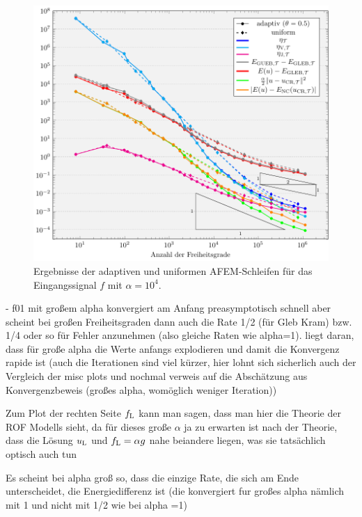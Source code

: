 \begin{figure}[p]
  \centering
  \includegraphics[width=\linewidth]
    {pictures/chapExperiments/secExactSol/f01LargeAlpha/conv.pdf}
  \caption{Ergebnisse der adaptiven und uniformen AFEM-Schleifen für das 
  Eingangssignal $f$ mit $\alpha=10^4$.}
  \label{fig:f01LargeAlphaConvergence}
\end{figure}

  - f01 mit großem alpha konvergiert am Anfang preasymptotisch schnell aber
    scheint bei großen Freiheitsgraden dann auch die Rate 1/2 (für Gleb Kram)
    bzw. 1/4 oder so für Fehler anzunehmen (also gleiche Raten wie alpha=1).
    liegt daran, dass für große alpha die Werte anfangs explodieren und damit
    die Konvergenz rapide ist (auch die Iterationen sind viel kürzer, hier
    lohnt sich sicherlich auch der Vergleich der misc plots und nochmal verweis
    auf die Abschätzung aus Konvergenzbeweis (großes alpha, womöglich weniger
    Iteration))

    Zum Plot der rechten Seite $f_\textup{L}$ kann man sagen, dass man hier die
    Theorie der ROF Modells sieht, da für dieses große $\alpha$ ja zu erwarten
    ist nach der Theorie, dass die Lösung $u_\textup{L}$ und
    $f_\textup{L}=\alpha g$ nahe beiandere liegen, was sie tatsächlich 
    optisch auch tun

Es scheint bei alpha groß so, dass die einzige Rate, die sich am Ende 
unterscheidet, die Energiedifferenz ist (die konvergiert fur großes
alpha nämlich mit 1 und nicht mit 1/2 wie bei alpha =1)

